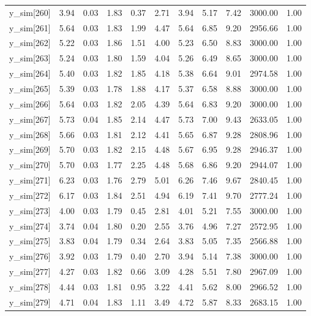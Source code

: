 \begin{table}[ht]
\begin{tabular}{rrrrrrrrrrr}
  y\_sim[260] & 3.94 & 0.03 & 1.83 & 0.37 & 2.71 & 3.94 & 5.17 & 7.42 & 3000.00 & 1.00 \\ 
  y\_sim[261] & 5.64 & 0.03 & 1.83 & 1.99 & 4.47 & 5.64 & 6.85 & 9.20 & 2956.66 & 1.00 \\ 
  y\_sim[262] & 5.22 & 0.03 & 1.86 & 1.51 & 4.00 & 5.23 & 6.50 & 8.83 & 3000.00 & 1.00 \\ 
  y\_sim[263] & 5.24 & 0.03 & 1.80 & 1.59 & 4.04 & 5.26 & 6.49 & 8.65 & 3000.00 & 1.00 \\ 
  y\_sim[264] & 5.40 & 0.03 & 1.82 & 1.85 & 4.18 & 5.38 & 6.64 & 9.01 & 2974.58 & 1.00 \\ 
  y\_sim[265] & 5.39 & 0.03 & 1.78 & 1.88 & 4.17 & 5.37 & 6.58 & 8.88 & 3000.00 & 1.00 \\ 
  y\_sim[266] & 5.64 & 0.03 & 1.82 & 2.05 & 4.39 & 5.64 & 6.83 & 9.20 & 3000.00 & 1.00 \\ 
  y\_sim[267] & 5.73 & 0.04 & 1.85 & 2.14 & 4.47 & 5.73 & 7.00 & 9.43 & 2633.05 & 1.00 \\ 
  y\_sim[268] & 5.66 & 0.03 & 1.81 & 2.12 & 4.41 & 5.65 & 6.87 & 9.28 & 2808.96 & 1.00 \\ 
  y\_sim[269] & 5.70 & 0.03 & 1.82 & 2.15 & 4.48 & 5.67 & 6.95 & 9.28 & 2946.37 & 1.00 \\ 
  y\_sim[270] & 5.70 & 0.03 & 1.77 & 2.25 & 4.48 & 5.68 & 6.86 & 9.20 & 2944.07 & 1.00 \\ 
  y\_sim[271] & 6.23 & 0.03 & 1.76 & 2.79 & 5.01 & 6.26 & 7.46 & 9.67 & 2840.45 & 1.00 \\ 
  y\_sim[272] & 6.17 & 0.03 & 1.84 & 2.51 & 4.94 & 6.19 & 7.41 & 9.70 & 2777.24 & 1.00 \\ 
  y\_sim[273] & 4.00 & 0.03 & 1.79 & 0.45 & 2.81 & 4.01 & 5.21 & 7.55 & 3000.00 & 1.00 \\ 
  y\_sim[274] & 3.74 & 0.04 & 1.80 & 0.20 & 2.55 & 3.76 & 4.96 & 7.27 & 2572.95 & 1.00 \\ 
  y\_sim[275] & 3.83 & 0.04 & 1.79 & 0.34 & 2.64 & 3.83 & 5.05 & 7.35 & 2566.88 & 1.00 \\ 
  y\_sim[276] & 3.92 & 0.03 & 1.79 & 0.40 & 2.70 & 3.94 & 5.14 & 7.38 & 3000.00 & 1.00 \\ 
  y\_sim[277] & 4.27 & 0.03 & 1.82 & 0.66 & 3.09 & 4.28 & 5.51 & 7.80 & 2967.09 & 1.00 \\ 
  y\_sim[278] & 4.44 & 0.03 & 1.81 & 0.95 & 3.22 & 4.41 & 5.62 & 8.00 & 2966.52 & 1.00 \\ 
  y\_sim[279] & 4.71 & 0.04 & 1.83 & 1.11 & 3.49 & 4.72 & 5.87 & 8.33 & 2683.15 & 1.00 \\ 

\end{tabular}
\end{table}
